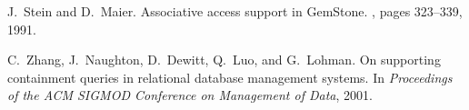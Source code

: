\documentclass[fleqn,11pt]{article}
\newcommand{\cheatbaseline}{1.44}
\renewcommand{\baselinestretch}{\cheatbaseline}
\begin{document}
\begin{small}
{
J.~Stein and D.~Maier.
\newblock Associative access support in GemStone.
, pages 323--339, 1991.

C.~Zhang, J.~Naughton, D.~Dewitt, Q.~Luo, and G.~Lohman.
\newblock On supporting containment queries in relational database management
  systems.
\newblock In {\em Proceedings of the ACM SIGMOD Conference on Management of
  Data}, 2001.
}

\end{small}
\renewcommand{\baselinestretch}{\cheatbaseline}
\end{document}
